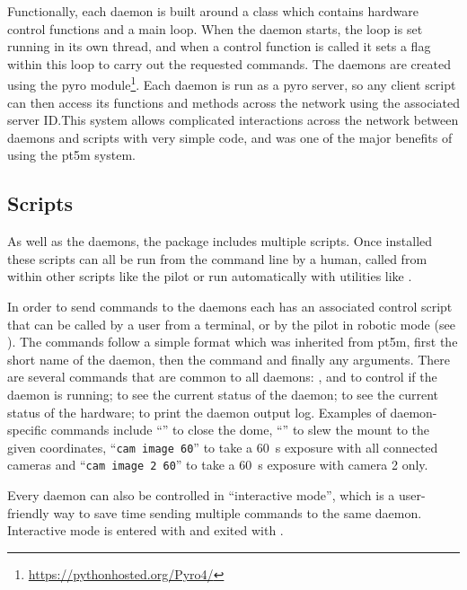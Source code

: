 \begin{colsection}
\begin{colsection}
Functionally, each daemon is built around a  class which contains hardware control functions and a main loop. When the daemon starts, the loop is set running in its own thread, and when a control function is called it sets a flag within this loop to carry out the requested commands. The daemons are created using the \gls{pyro} module\footnote{\url{https://pythonhosted.org/Pyro4/}}. Each daemon is run as a \gls{pyro} server, so any client script can then access its functions and methods across the network using the associated server ID.\@ This system allows complicated interactions across the network between daemons and scripts with very simple code, and was one of the major benefits of using the \gls{pt5m} system.

\end{colsection}


\subsection{Scripts}
\label{sec:scripts}
\begin{colsection}

As well as the daemons, the  package includes multiple  scripts. Once installed these scripts can all be run from the command line by a human, called from within other scripts like the pilot or run automatically with utilities like .

In order to send commands to the daemons each has an associated control script that can be called by a user from a terminal, or by the pilot in robotic mode (see ). The commands follow a simple format which was inherited from \gls{pt5m}, first the short name of the daemon, then the command and finally any arguments. There are several commands that are common to all daemons: ,  and  to control if the daemon is running;  to see the current status of the daemon;  to see the current status of the hardware;  to print the daemon output log. Examples of daemon-specific commands include ``'' to close the dome, ``'' to slew the mount to the given coordinates, ``\texttt{cam~image~60}'' to take a \SI{60}{\second} exposure with all connected cameras and ``\texttt{cam~image~2~60}'' to take a \SI{60}{\second} exposure with camera 2 only.

Every daemon can also be controlled in ``interactive mode'', which is a user-friendly way to save time sending multiple commands to the same daemon. Interactive mode is entered with  and exited with .


\end{colsection}
\end{colsection}
